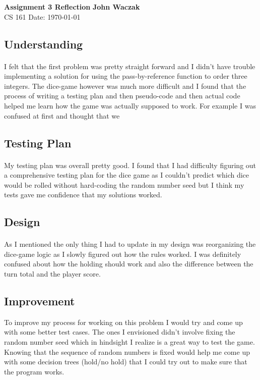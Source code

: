 \documentclass[a4paper, 11pt]{article}
\begin{document}
\noindent
\large\textbf{Assignment 3 Reflection} \hfill \textbf{John Waczak} \\
\normalsize CS 161 \hfill  Date: \today \\

\subsection*{Understanding}
	\paragraph{}
	I felt that the first problem was pretty straight forward and I didn't have trouble implementing a solution for using the pass-by-reference function to order three integers. The dice-game however was much more difficult and I found that the process of writing a testing plan and then pseudo-code and then actual code helped me learn how the game was actually supposed to work. For example I was confused at first and thought that we 
	
\subsection*{Testing Plan}
	\paragraph{}
	My testing plan was overall pretty good. I found that I had difficulty figuring out a comprehensive testing plan  for the dice game as I couldn't predict which dice would be rolled without hard-coding the random number seed but I think my tests gave me confidence that my solutions worked. 
\subsection*{Design}
	\paragraph{}
	As I mentioned the only thing I had to update in my design was reorganizing the dice-game logic as I slowly figured out how the rules worked. I was definitely confused about how the holding should work and also the difference between the turn total and the player score. 
 
\subsection*{Improvement} 
	 To improve my process for working on this problem I would try and come up with some better test cases. The ones I envisioned didn't involve fixing the random number seed which in hindsight I realize is a great way to test the game. Knowing that the sequence of random numbers is fixed would help me come up with some decision trees (hold/no hold) that I could try out to make sure that the program works. 
		
		
\end{document}
